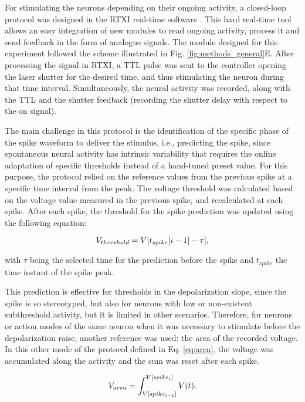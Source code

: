 For stimulating the neurons depending on their ongoing activity, a closed-loop protocol was designed in the RTXI real-time software \cite{Patel2017}. This hard real-time tool allows an easy integration of new modules to read ongoing activity, process it and send feedback in the form of analogue signals. The module designed for this experiment followed the scheme illustrated in Fig. \ref{fig:methods_general}E. After processing the signal in RTXI, a TTL pulse was sent to the controller opening the laser shutter for the desired time, and thus stimulating the neuron during that time interval. Simultaneously, the neural activity was recorded, along with the TTL and the shutter feedback (recording the shutter delay with respect to the on signal).

The main challenge in this protocol is the identification of the specific phase of the spike waveform to deliver the stimulus, i.e., predicting the spike, since spontaneous neural activity has intrinsic variability that requires the online adaptation of specific thresholds instead of a hand-tuned preset value. For this purpose, the protocol relied on the reference values from the previous spike at a specific time interval from the peak. The voltage threshold was calculated based on the voltage value measured in the previous spike, and recalculated at each spike. After each spike, the threshold for the spike prediction was updated using the following equation:

\begin{equation}
    \centering 
    V_{threshold}=V[t_{spike}[i-1]-\tau],
\end{equation}
    
\noindent with $\tau$ being the selected time for the prediction before the spike and $t_{spike}$ the time instant of the spike peak.

This prediction is effective for thresholds in the depolarization slope, since the spike is so stereotyped, but also for neurons with low or non-existent subthreshold activity, but it is limited in other scenarios. Therefore, for neurons or action modes of the same neuron when it was necessary to stimulate before the depolarization raise, another reference was used: the area of the recorded voltage. In this other mode of the protocol defined in Eq. \ref{eq:area}, the voltage was accumulated along the activity and the sum was reset after each spike. 

\begin{equation}
    \centering 
    V_{area}=\int_{V[spike_{i-1}]}^{V[spike_{i}]}V(t).
    \label{eq:area}
\end{equation}


